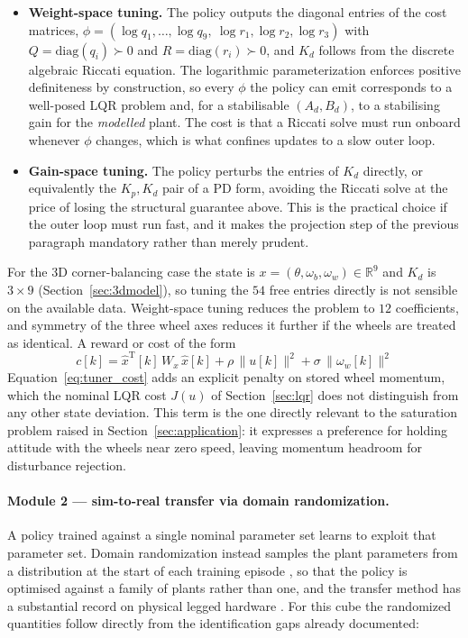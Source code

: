 \begin{itemize}
    \item \textbf{Weight-space tuning.} The policy outputs the diagonal
    entries of the cost matrices,
    $\phi = (\log q_1,\dots,\log q_9,\ \log r_1, \log r_2, \log r_3)$ with
    $Q = \mathrm{diag}(q_i) \succ 0$ and $R = \mathrm{diag}(r_i) \succ 0$, and
    $K_d$ follows from the discrete algebraic Riccati equation. The
    logarithmic parameterization enforces positive definiteness by
    construction, so every $\phi$ the policy can emit corresponds to a
    well-posed LQR problem and, for a stabilisable $(A_d,B_d)$, to a
    stabilising gain for the \emph{modelled} plant. The cost is that a Riccati
    solve must run onboard whenever $\phi$ changes, which is what confines
    updates to a slow outer loop.
    \item \textbf{Gain-space tuning.} The policy perturbs the entries of $K_d$
    directly, or equivalently the $K_p, K_d$ pair of a PD form, avoiding the
    Riccati solve at the price of losing the structural guarantee above. This
    is the practical choice if the outer loop must run fast, and it makes the
    projection step of the previous paragraph mandatory rather than merely
    prudent.
\end{itemize}

For the 3D corner-balancing case the state is
$x = (\theta, \omega_b, \omega_w) \in \mathbb{R}^9$ and $K_d$ is $3\times 9$
(Section~\ref{sec:3dmodel}), so tuning the $54$ free entries directly is not
sensible on the available data. Weight-space tuning reduces the problem to
$12$ coefficients, and symmetry of the three wheel axes reduces it further if
the wheels are treated as identical. A reward or cost of the form
\begin{equation}
c[k] = \hat x^{\mathrm T}[k]\,W_x\,\hat x[k] + \rho\,\|u[k]\|^2 + \sigma\,\|\omega_w[k]\|^2
\label{eq:tuner_cost}
\end{equation}
Equation~\eqref{eq:tuner_cost} adds an explicit penalty on stored wheel momentum, which the nominal LQR cost
$J(u)$ of Section~\ref{sec:lqr} does not distinguish from any other
state deviation. This term is the one directly relevant to the saturation
problem raised in Section~\ref{sec:application}: it expresses a preference for
holding attitude with the wheels near zero speed, leaving momentum headroom
for disturbance rejection.

\paragraph{Module 2 --- sim-to-real transfer via domain randomization.} A policy trained against a single nominal parameter set learns to exploit that
parameter set. Domain randomization instead samples the plant parameters from
a distribution at the start of each training episode
\cite{tobin2017domainrand}, so that the policy is optimised against a family
of plants rather than one, and the transfer method has a substantial record on
physical legged hardware \cite{hwangbo2019anymal}. For this cube the
randomized quantities follow directly from the identification gaps already
documented:

